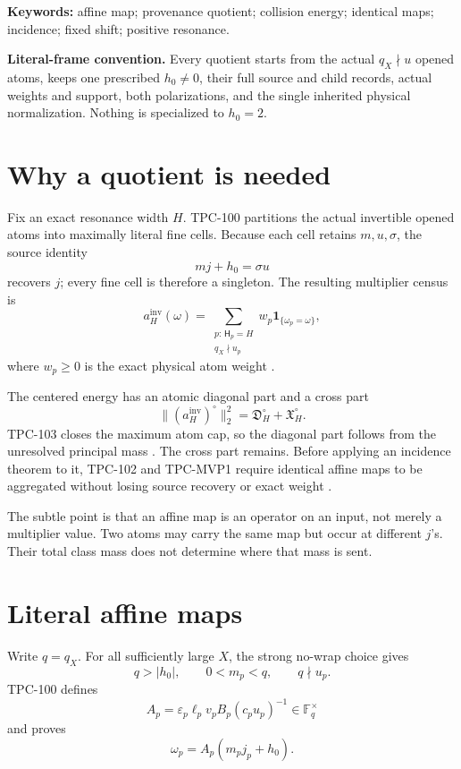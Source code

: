 \documentclass[11pt]{article}
\theoremstyle{definition}
\theoremstyle{remark}
\newcommand{\F}{\mathbb F}
\newcommand{\one}{\mathbf 1}
\begin{document}
\noindent\textbf{Keywords:}
affine map; provenance quotient; collision energy; identical maps;
incidence; fixed shift; positive resonance.

\medskip
\noindent\textbf{Literal-frame convention.}
Every quotient starts from the actual \(q_X\nmid u\) opened atoms,
keeps one prescribed \(h_0\ne0\), their full source and child
records, actual weights and support, both polarizations, and the
single inherited physical normalization.  Nothing is specialized
to \(h_0=2\).

\section{Why a quotient is needed}
\label{sec:introduction}

Fix an exact resonance width \(H\).  TPC-100 partitions the actual
invertible opened atoms into maximally literal fine cells.  Because
each cell retains \(m,u,\sigma\), the source identity
\[
 mj+h_0=\sigma u
\]
recovers \(j\); every fine cell is therefore a singleton.  The
resulting multiplier census is
\begin{equation}
 a_H^{\mathrm{inv}}(\omega)
 =
 \sum_{\substack{p:\,\mathsf H_p=H\\q_X\nmid u_p}}
 w_p\one_{\{\omega_p=\omega\}},
\label{eq:census}
\end{equation}
where \(w_p\ge0\) is the exact physical atom weight
\citep{WangTPC100}.

The centered energy has an atomic diagonal part and a cross part
\[
 \|(a_H^{\mathrm{inv}})^\circ\|_2^2
 =
 \mathfrak D_H^\circ+\mathfrak X_H^\circ.
\]
TPC-103 closes the maximum atom cap, so the diagonal part follows
from the unresolved principal mass
\citep{WangTPC101,WangTPC103}.  The cross part remains.  Before
applying an incidence theorem to it, TPC-102 and TPC-MVP1 require
identical affine maps to be aggregated without losing source
recovery or exact weight \citep{WangTPC102,WangTPCMVP1}.

The subtle point is that an affine map is an operator on an input,
not merely a multiplier value.  Two atoms may carry the same map
but occur at different \(j\)'s.  Their total class mass does not
determine where that mass is sent.

\section{Literal affine maps}
\label{sec:maps}

Write \(q=q_X\).  For all sufficiently large \(X\), the strong
no-wrap choice gives
\[
 q>|h_0|,\qquad 0<m_p<q,\qquad q\nmid u_p.
\]
TPC-100 defines
\[
 A_p=
 \varepsilon_p\ell_pv_pB_p(c_pu_p)^{-1}
 \in\F_q^\times
\]
and proves
\begin{equation}
 \omega_p=A_p(m_pj_p+h_0).
\label{eq:linearization}
\end{equation}
\end{document}
